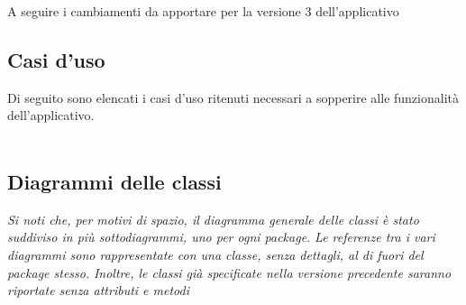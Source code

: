 A seguire i cambiamenti da apportare per la versione 3 dell'applicativo

\subsection{Casi d'uso}
Di seguito sono elencati i casi d'uso ritenuti necessari a sopperire alle funzionalità
dell'applicativo.
\\\\





\pagebreak


\pagebreak
\subsection{Diagrammi delle classi}

\textit{Si noti che, per motivi di spazio, il diagramma generale delle classi è stato suddiviso in più sottodiagrammi, uno per ogni package.}
\textit{Le referenze tra i vari diagrammi sono rappresentate con una classe, senza dettagli, al di fuori del package stesso.}
\textit{Inoltre, le classi già specificate nella versione precedente saranno riportate senza attributi e metodi}




